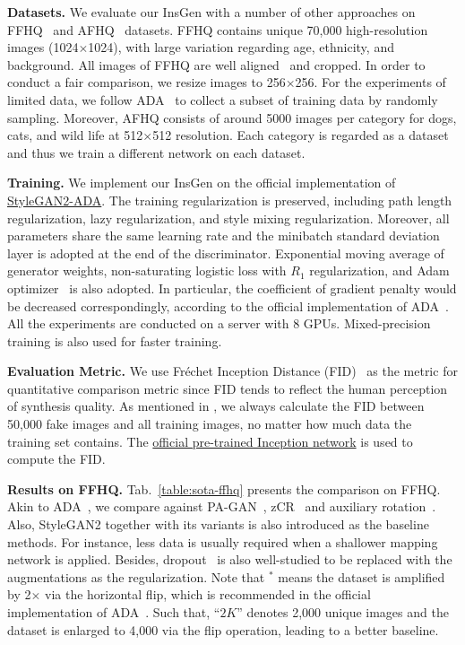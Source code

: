 \documentclass{article}
\begin{document}
\noindent\textbf{Datasets.}
We evaluate our InsGen with a number of other approaches on FFHQ~\cite{karras2019style} and AFHQ~\cite{choi2020starganv2} datasets. FFHQ contains unique 70,000 high-resolution images (1024$\times$1024), with large variation regarding age, ethnicity, and background. All images of FFHQ are well aligned~\cite{kazemi2014one} and cropped. In order to conduct a fair comparison, we resize images to 256$\times$256. For the experiments of limited data, we follow ADA~\cite{karras2020training} to collect a subset of training data by randomly sampling. Moreover, AFHQ consists of around 5000 images per category for dogs, cats, and wild life at 512$\times$512 resolution. Each category is regarded as a dataset and thus we train a different network on each dataset.


\noindent\textbf{Training.}
We implement our InsGen on the official implementation of \href{https://github.com/NVlabs/stylegan2-ada-pytorch}{StyleGAN2-ADA}. The training regularization is preserved, including path length regularization, lazy regularization, and style mixing regularization. Moreover, all parameters share the same learning rate and the minibatch standard deviation layer is adopted at the end of the discriminator. Exponential moving average of generator weights, non-saturating logistic loss with $R_1$ regularization, and Adam optimizer~\cite{kingma2014adam} is also adopted. In particular, the coefficient of gradient penalty would be decreased correspondingly, according to the official implementation of ADA~\cite{karras2020training}. All the experiments are conducted on a server with 8 GPUs. Mixed-precision training is also used for faster training.


\noindent\textbf{Evaluation Metric.}
We use Fréchet Inception Distance (FID)~\cite{heusel2017gans} as the metric for quantitative comparison metric since FID tends to reflect the human perception of synthesis quality. As mentioned in \cite{heusel2017gans}, we always calculate the FID between 50,000 fake images and all training images, no matter how much data the training set contains. The \href{http://download.tensorflow.org/models/image/imagenet/inception-2015-12-05.tgz}{official pre-trained Inception network} is used to compute the FID.


\noindent\textbf{Results on FFHQ.}
Tab.~\ref{table:sota-ffhq} presents the comparison on FFHQ. Akin to ADA~\cite{karras2020training}, we compare against PA-GAN~\cite{zhang2018pa}, zCR~\cite{zhao2020improved} and auxiliary rotation~\cite{chen2019self}. Also, StyleGAN2 together with its variants is also introduced as the baseline methods. For instance, less data is usually required when a shallower mapping network is applied. Besides, dropout~\cite{srivastava2014dropout} is also well-studied to be replaced with the augmentations as the regularization. Note that $^*$ means the dataset is amplified by 2$\times$ via the horizontal flip, which is recommended in the official implementation of ADA~\cite{karras2020training}. Such that, ``$2K$'' denotes 2,000 unique images and the dataset is enlarged to 4,000 via the flip operation, leading to a better baseline.
\end{document}
